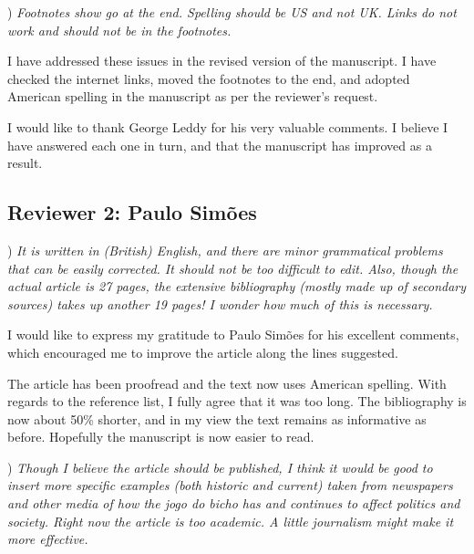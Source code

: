 \documentclass[a4paper,12pt]{article}
\begin{document}
\vspace{.5cm}

) \textit{Footnotes show go at the end. Spelling should be US and not UK. Links do not work and should not be in the footnotes.}

\vspace{.25cm}

I have addressed these issues in the revised version of the manuscript. I have checked the internet links, moved the footnotes to the end, and adopted American spelling in the manuscript as per the reviewer's request.

\vspace{.5cm}

I would like to thank George Leddy for his very valuable comments. I believe I have answered each one in turn, and that the manuscript has improved as a result.


\newpage 

\subsection*{Reviewer 2: Paulo Simões} %
\label{sub:reviewer_2_paulo_simoes}

) \textit{It is written in (British) English, and there are minor grammatical problems that can be easily corrected. It should not be too difficult to edit. Also, though the actual article is 27 pages, the extensive bibliography (mostly made up of secondary sources) takes up another 19 pages! I wonder how much of this is necessary.}

\vspace{.25cm}

I would like to express my gratitude to Paulo Simões for his excellent comments, which encouraged me to improve the article along the lines suggested.

The article has been proofread and the text now uses American spelling. With regards to the reference list, I fully agree that it was too long. The bibliography is now about 50\% shorter, and in my view the text remains as informative as before. Hopefully the manuscript is now easier to read.

\vspace{.5cm}

) \textit{Though I believe the article should be published, I think it would be good to insert more specific examples (both historic and current) taken from newspapers and other media of how the jogo do bicho has and continues to affect politics and society. Right now the article is too academic. A little journalism might make it more effective.}
\end{document}
